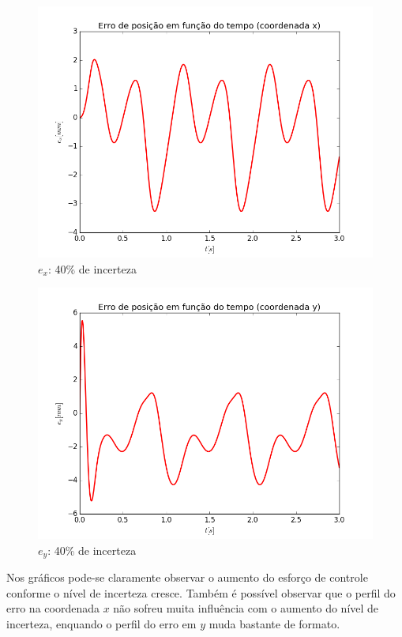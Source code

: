 \documentclass[]{politex}
\begin{document}
\begin{multicols}{2}
\begin{figure}[H]
	\centering
	\includegraphics[scale=0.40]{imagens/ex_40.png}  
	\caption{$e_x$: 40\% de incerteza}
	\label{fig:ex_40}
\end{figure}
\begin{figure}[H]
	\centering
	\includegraphics[scale=0.40]{imagens/ey_40.png}  
	\caption{$e_y$: 40\% de incerteza}
	\label{fig:ey_40}
\end{figure}
\end{multicols}

\newpage

Nos gráficos pode-se claramente observar o aumento do esforço de controle conforme o nível de incerteza cresce. Também é possível observar que o perfil do erro na coordenada $x$ não sofreu muita influência com o aumento do nível de incerteza, enquando o perfil do erro em $y$ muda bastante de formato.
\end{document}
